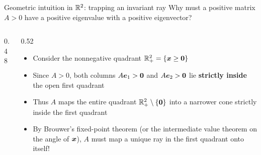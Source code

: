 \documentclass[aspectratio=169]{beamer}\usepackage[]{graphicx}\usepackage[]{xcolor}
\begin{document}
\begin{frame}{Geometric intuition in $\mathbb{R}^2$: trapping an invariant ray}
Why must a positive matrix $A > 0$ have a positive eigenvalue with a positive eigenvector?
\begin{columns}[c]
\begin{column}{0.48\textwidth}
\centering
{}
\end{column}
\begin{column}{0.52\textwidth}
\begin{itemize}
\item Consider the nonnegative quadrant $\IR_+^2 = \{\bx \ge \b0\}$
\item Since $A > 0$, both columns $A\be_1 > \b0$ and $A\be_2 > \b0$ lie \textbf{strictly inside} the open first quadrant
\item Thus $A$ maps the entire quadrant $\IR_+^2 \setminus \{\b0\}$ into a narrower cone strictly inside the first quadrant
\item By Brouwer's fixed-point theorem (or the intermediate value theorem on the angle of $\bm{x}$), $A$ must map a unique ray in the first quadrant onto itself!
\end{itemize}
\end{column}
\end{columns}
\end{frame}
\end{document}
